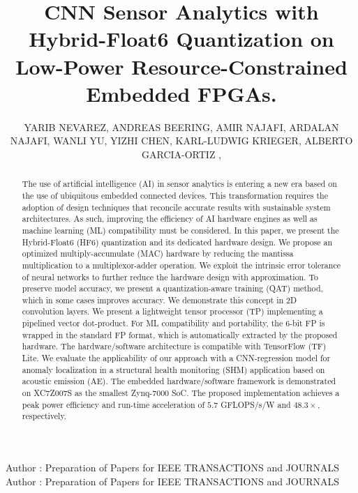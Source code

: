 \title {CNN Sensor Analytics with Hybrid-Float6 Quantization on Low-Power Resource-Constrained Embedded FPGAs.}

\author{
	\uppercase{Yarib Nevarez},
	\uppercase{Andreas Beering},
	\uppercase{Amir Najafi},
	\uppercase{Ardalan Najafi},
	\uppercase{Wanli Yu},
	\uppercase{Yizhi Chen},
	\uppercase{Karl-Ludwig Krieger},
	\uppercase{Alberto Garcia-Ortiz} ,
}

\address[1]{Institute of Electrodynamics and Microelectronics, University of Bremen, Bremen 28359, Germany}

\address[2]{School of Electrical Engineering and Computer Science, KTH Royal Institute of Technology, 10044 Stockholm, Sweden}



\markboth
{Author \headeretal: Preparation of Papers for IEEE TRANSACTIONS and JOURNALS}
{Author \headeretal: Preparation of Papers for IEEE TRANSACTIONS and JOURNALS}


\begin{abstract}
The use of artificial intelligence (AI) in sensor analytics is entering a new era based on the use of ubiquitous embedded connected devices. This transformation requires the adoption of design techniques that reconcile accurate results with sustainable system architectures. As such, improving the efficiency of AI hardware engines as well as machine learning (ML) compatibility must be considered. In this paper, we present the Hybrid-Float6 (HF6) quantization and its dedicated hardware design. We propose an optimized multiply-accumulate (MAC) hardware by reducing the mantissa multiplication to a multiplexor-adder operation. We exploit the intrinsic error tolerance of neural networks to further reduce the hardware design with approximation. To preserve model accuracy, we present a quantization-aware training (QAT) method, which in some cases improves accuracy. We demonstrate this concept in 2D convolution layers. We present a lightweight tensor processor (TP) implementing a pipelined vector dot-product. For ML compatibility and portability, the 6-bit FP is wrapped in the standard FP format, which is automatically extracted by the proposed hardware. The hardware/software architecture is compatible with TensorFlow (TF) Lite. We evaluate the applicability of our approach with a CNN-regression model for anomaly localization in a structural health monitoring (SHM) application based on acoustic emission (AE). The embedded hardware/software framework is demonstrated on XC7Z007S as the smallest Zynq-7000 SoC. The proposed implementation achieves a peak power efficiency and run-time acceleration of $5.7$ GFLOPS/s/W and $48.3\times$, respectively.
\end{abstract}


